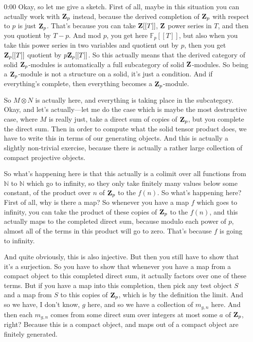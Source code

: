 \begin{unfinished}{0:00}
Okay, so let me give a sketch. First of all, maybe in this situation you can actually work with $\mathbf Z_p$ instead, because the derived completion of $\mathbf Z_p$ with respect to $p$ is just $\mathbf Z_p$. That's because you can take $\mathbf Z[[T]]$, $\mathbf Z$ power series in $T$, and then you quotient by $T-p$. And mod $p$, you get here $\mathbb{F}_p[[T]]$, but also when you take this power series in two variables and quotient out by $p$, then you get $\mathbf Z_p[[T]]$ quotient by $p\mathbf Z_p[[T]]$. So this actually means that the derived category of solid $\mathbf Z_p$-modules is automatically a full subcategory of solid $\mathbf Z$-modules. So being a $\mathbf Z_p$-module is not a structure on a solid, it's just a condition. And if everything's complete, then everything becomes a $\mathbf Z_p$-module.

So $M \otimes N$ is actually here, and everything is taking place in the subcategory. Okay, and let's actually---let me do the case which is maybe the most destructive case, where $M$ is really just, take a direct sum of copies of $\mathbf Z_p$, but you complete the direct sum. Then in order to compute what the solid tensor product does, we have to write this in terms of our generating objects. And this is actually a slightly non-trivial exercise, because there is actually a rather large collection of compact projective objects.

So what's happening here is that this actually is a colimit over all functions from $\mathbb{N}$ to $\mathbb{N}$ which go to infinity, so they only take finitely many values below some constant, of the product over $n$ of $\mathbf Z_p$ to the $f(n)$. So what's happening here? First of all, why is there a map? So whenever you have a map $f$ which goes to infinity, you can take the product of these copies of $\mathbf Z_p$ to the $f(n)$, and this actually maps to the completed direct sum, because modulo each power of $p$, almost all of the terms in this product will go to zero. That's because $f$ is going to infinity.

And quite obviously, this is also injective. But then you still have to show that it's a surjection. So you have to show that whenever you have a map from a compact object to this completed direct sum, it actually factors over one of these terms. But if you have a map into this completion, then pick any test object $S$ and a map from $S$ to this copies of $\mathbf Z_p$, which is by the definition the limit. And so we have, I don't know, $g$ here, and so we have a collection of $m_{g,n}$ here. And then each $m_{g,n}$ comes from some direct sum over integers at most some $a$ of $\mathbf Z_p$, right? Because this is a compact object, and maps out of a compact object are finitely generated.


\end{unfinished}
